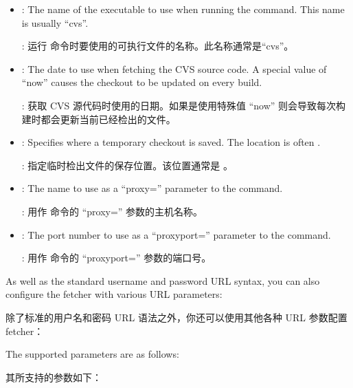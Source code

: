 \begin{itemize}
\setlength\itemsep{1.0em}
\item {}: The name of the executable to use when running the  command. This name is usually ``cvs''.

\medskip
{}: 运行  命令时要使用的可执行文件的名称。此名称通常是“cvs”。

\item {}: The date to use when fetching the CVS source code. A special value of ``now'' causes the checkout to be updated on every build.

\medskip
{}: 获取 CVS 源代码时使用的日期。如果是使用特殊值 ``now'' 则会导致每次构建时都会更新当前已经检出的文件。

\item {}: Specifies where a temporary checkout is saved. The location is often .

\medskip
{}: 指定临时检出文件的保存位置。该位置通常是 。

\item {}: The name to use as a ``proxy='' parameter to the  command.

\medskip
{}: 用作  命令的 ``proxy='' 参数的主机名称。

\item {}: The port number to use as a ``proxyport='' parameter to the  command.

\medskip
{}: 用作  命令的 ``proxyport='' 参数的端口号。
\end{itemize}

As well as the standard username and password URL syntax, you can also configure the fetcher with various URL parameters:

除了标准的用户名和密码 URL 语法之外，你还可以使用其他各种 URL 参数配置 fetcher：

The supported parameters are as follows:

其所支持的参数如下：

